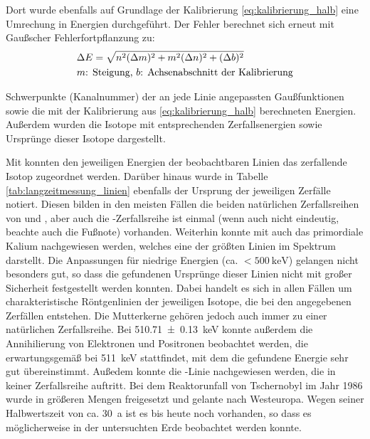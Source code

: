 \documentclass[11pt, a4paper]{article}
\numberwithin{equation}{section}
\newcommand{\cs}{\isotope[137]{Cs}}
\begin{document}
Dort wurde ebenfalls auf Grundlage der Kalibrierung \eqref{eq:kalibrierung_halb} eine Umrechung in Energien durchgeführt.
Der Fehler berechnet sich erneut mit Gaußscher Fehlerfortpflanzung zu:
\begin{align}
&\Delta E = \sqrt{n^2 (\Delta m)^2 + m^2 (\Delta n)^2 + (\Delta b)^2} \\
&\text{$m$: Steigung, $b$: Achsenabschnitt der Kalibrierung} \notag
\end{align}
\begin{table}
	\centering
	
	\caption{Schwerpunkte (Kanalnummer) der an jede Linie angepassten Gaußfunktionen sowie die mit der Kalibrierung aus \eqref{eq:kalibrierung_halb} berechneten Energien. Außerdem wurden die Isotope mit entsprechenden Zerfallsenergien sowie Ursprünge dieser Isotope dargestellt.}
	\label{tab:langzeitmessung_linien}
\end{table}
Mit \cite{gilmore} konnten den jeweiligen Energien der beobachtbaren Linien das zerfallende Isotop zugeordnet werden.
Darüber hinaus wurde in Tabelle \ref{tab:langzeitmessung_linien} ebenfalls der Ursprung der jeweiligen Zerfälle notiert.
Diesen bilden in den meisten Fällen die beiden natürlichen Zerfallsreihen von  und , aber auch die -Zerfallsreihe ist einmal (wenn auch nicht eindeutig, beachte auch die Fußnote) vorhanden.
Weiterhin konnte mit  auch das primordiale Kalium nachgewiesen werden, welches eine der größten Linien im Spektrum darstellt.
Die Anpassungen für niedrige Energien (ca. $<\SI{500}{\kilo\electronvolt}$) gelangen nicht besonders gut, so dass die gefundenen Ursprünge dieser Linien nicht mit großer Sicherheit festgestellt werden konnten.
Dabei handelt es sich in allen Fällen um charakteristische Röntgenlinien der jeweiligen Isotope, die bei den angegebenen Zerfällen entstehen.
Die Mutterkerne gehören jedoch auch immer zu einer natürlichen Zerfallsreihe.
Bei \SI{510.71+-0.13}{\kilo\electronvolt} konnte außerdem die Annihilierung von Elektronen und Positronen beobachtet werden, die erwartungsgemäß bei \SI{511}{\kilo\electronvolt} stattfindet, mit dem die gefundene Energie sehr gut übereinstimmt.
Außedem konnte die \cs{}-Linie nachgewiesen werden, die in keiner Zerfallsreihe auftritt.
Bei dem Reaktorunfall von Tschernobyl im Jahr 1986 wurde \cs{} in größeren Mengen freigesetzt und gelante nach Westeuropa.
Wegen seiner Halbwertszeit von ca. \SI{30}{a} ist es bis heute noch vorhanden, so dass es möglicherweise in der untersuchten Erde beobachtet werden konnte. 
\end{document}
